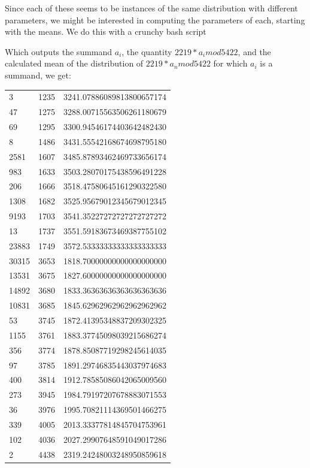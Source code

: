 \documentclass{article}
\theoremstyle{definition}
\theoremstyle{remark}
\numberwithin{equation}{section}
\begin{document}
{Since each of these seems to be instances of the same distribution
with different parameters, we might be interested in computing the
parameters of each, starting with the means.  We do this with a crunchy bash script




Which outputs the summand $a_i$, the quantity $2219*a_i mod 5422$,
and the calculated mean of the distribution of $2219*a_n mod 5422$ for
which $a_i$ is a summand, we get:

\begin{tabular}{lll}
3	&1235	&3241.07886089813800657174\\
47	&1275	&3288.00715563506261180679\\
69	&1295	&3300.94546174403642482430\\
8	&1486	&3431.55542168674698795180\\
2581	&1607	&3485.87893462469733656174\\
983	&1633	&3503.28070175438596491228\\
206	&1666	&3518.47580645161290322580\\
1308	&1682	&3525.95679012345679012345\\
9193	&1703	&3541.35227272727272727272\\
13	&1737	&3551.59183673469387755102\\
23883	&1749	&3572.53333333333333333333\\
30315	&3653	&1818.70000000000000000000\\
13531	&3675	&1827.60000000000000000000\\
14892	&3680	&1833.36363636363636363636\\
10831	&3685	&1845.62962962962962962962\\
53	&3745	&1872.41395348837209302325\\
1155	&3761	&1883.37745098039215686274\\
356	&3774	&1878.85087719298245614035\\
97	&3785	&1891.29746835443037974683\\
400	&3814	&1912.78585086042065009560\\
273	&3945	&1984.79197207678883071553\\
36	&3976	&1995.70821114369501466275\\
339	&4005	&2013.33377814845704753961\\
102	&4036	&2027.29907648591049017286\\
2	&4438	&2319.24248003248950859618
\end{tabular}

}
\end{document}
